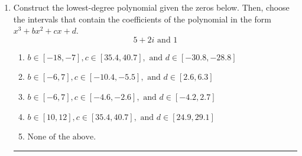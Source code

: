 \documentclass[14pt]{extbook}
\newcommand{\litem}[1]{\item#1\hspace*{-1cm}\rule{\textwidth}{0.4pt}}
\begin{document}
\begin{enumerate}
\litem{
Construct the lowest-degree polynomial given the zeros below. Then, choose the intervals that contain the coefficients of the polynomial in the form $x^3+bx^2+cx+d$.\[ 5 + 2 i \text{ and } 1 \]\begin{enumerate}[label=\Alph*.]
\item \( b \in [-18, -7], c \in [35.4, 40.7], \text{ and } d \in [-30.8, -28.8] \)
\item \( b \in [-6, 7], c \in [-10.4, -5.5], \text{ and } d \in [2.6, 6.3] \)
\item \( b \in [-6, 7], c \in [-4.6, -2.6], \text{ and } d \in [-4.2, 2.7] \)
\item \( b \in [10, 12], c \in [35.4, 40.7], \text{ and } d \in [24.9, 29.1] \)
\item \( \text{None of the above.} \)


\end{enumerate}}
\end{enumerate}
\end{document}
